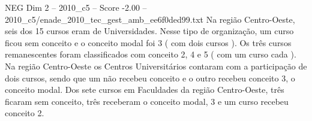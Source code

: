 \begin{textsample}{NEG Dim 2 – 2010\_c5 – Score -2.00 – 2010\_c5/enade\_2010\_tec\_gest\_amb\_ee6f0ded99.txt}
Na região Centro-Oeste, seis dos 15 cursos eram de Universidades.
Nesse tipo de organização, um curso ficou sem conceito e o conceito modal foi 3 ( com dois cursos ).
Os três cursos remanescentes foram classificados com conceito 2, 4 e 5 ( com um curso cada ).
Na região Centro-Oeste os Centros Universitários contaram com a participação de dois cursos, sendo que um não recebeu conceito e o outro recebeu conceito 3, o conceito modal.
Dos sete cursos em Faculdades da região Centro-Oeste, três ficaram sem conceito, três receberam o conceito modal, 3 e um curso recebeu conceito 2.

\end{textsample}
